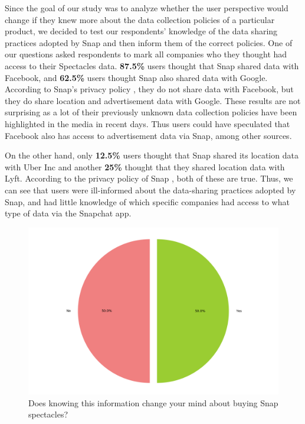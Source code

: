 \documentclass[sigconf]{acmart}
\begin{document}
Since the goal of our study was to analyze whether the user perspective would change if they knew more about the data collection policies of a particular product, we decided to test our respondents' knowledge of the data sharing practices adopted by Snap and then inform them of the correct policies. One of our questions asked respondents to mark all companies who they thought had access to their Spectacles data. \textbf{87.5\%} users thought that Snap shared data with Facebook, and \textbf{62.5\%} users thought Snap also shared data with Google. According to Snap's privacy policy \cite{snap-policy}, they do not share data with Facebook, but they do share location and advertisement data with Google. These results are not surprising as a lot of their previously unknown data collection policies have been highlighted \cite{facebookdatashare} in the media in recent days. Thus users could have speculated that Facebook also has access to advertisement data via Snap, among other sources.

On the other hand, only \textbf{12.5\%} users thought that Snap shared its location data with Uber Inc and another \textbf{25\%} thought that they shared location data with Lyft. According to the privacy policy of Snap \cite{snap-policy}, both of these are true. Thus, we can see that users were ill-informed about the data-sharing practices adopted by Snap, and had little knowledge of which specific companies had access to what type of data via the Snapchat app.

\begin{figure}[h]
  \centering
  \includegraphics[width=\linewidth]{snap_change_perspective.png}
  \caption{Does knowing this information change your mind about buying Snap spectacles?}
  \label{fig:snap_data_collect}
  \Description{}
\end{figure}
\end{document}
